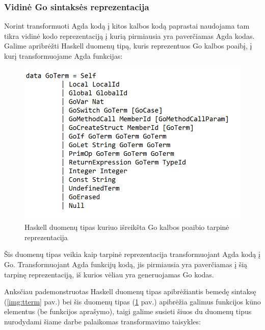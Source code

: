 \documentclass{VUMIFPSbakalaurinis}
\begin{document}
\subsubsection{Vidinė Go sintaksės reprezentacija}
\label{section:goTerm}
Norint transformuoti Agda kodą į kitos kalbos kodą paprastai naudojama tam tikra vidinė kodo reprezentaciją į kurią pirmiausia yra paverčiamas Agda kodas. Galime apribrėžti Haskell duomenų tipą, kuris reprezentuos Go kalbos poaibį, į kurį transformuojame Agda funkcijas:
\begin{figure}[H]
	\centering
	\includegraphics[scale=0.75]{GoTerm.png}
	\caption{Haskell duomenų tipas kuriuo išreikšta Go kalbos poaibio tarpinė reprezentacija}
	\label{img:goterm}
	\centering
	\end{figure}
Šis duomenų tipas veikia kaip tarpinė reprezentacija transformuojant Agda kodą į Go. Transformuojant Agda funkcijų kodą, jis pirmiausia yra paverčiamas į šią tarpinę reprezentaciją, iš kurios vėliau yra generuojamas Go kodas.
\par Anksčiau pademonstruotas Haskell duomenų tipas apibrėžiantis bemedę sintaksę (\ref{img:tterm} pav.) bei šis duomenų tipas (\ref{img:goterm} pav.) apibrėžia galimus funkcijos kūno elementus (be funkcijos aprašymo), taigi galime susieti šiuos du duomenų tipus nurodydami šiame darbe palaikomas transformavimo taisykles:
\end{document}
